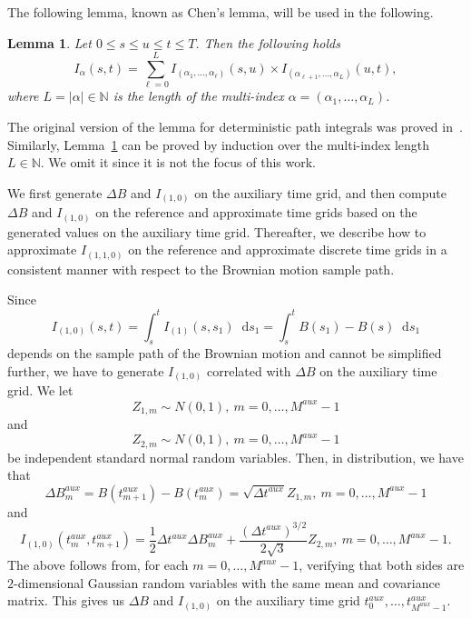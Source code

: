 \documentclass[11pt]{amsart}
\newtheorem{lemma}[theorem]{Lemma}
\newcommand*\diff{\mathop{}\!\mathrm{d}}
\begin{document}
{The following lemma, known as Chen's lemma, will be used in the following.
\begin{lemma}\label{lem:Chen_lemma}
Let $0 \leq s \leq u \leq t \leq T$. Then the following holds
\begin{equation*}
I_{\alpha}(s,t) = \sum_{\ell=0}^{L} I_{(\alpha_{1},\ldots,\alpha_{\ell})}(s,u) \times I_{(\alpha_{\ell+1},\ldots,\alpha_{L})}(u,t),
\end{equation*}
where $L = | \alpha| \in \mathbb{N}$ is the length of the multi-index $\alpha = (\alpha_{1},\ldots,\alpha_{L})$.
\end{lemma}
The original version of the lemma for deterministic path integrals was proved in~\cite{MR73174}. Similarly, Lemma~\ref{lem:Chen_lemma} can be proved by induction over the multi-index length $L \in \mathbb{N}$. We omit it since it is not the focus of this work.  

We first generate $\Delta B$ and $I_{(1,0)}$ on the auxiliary time grid, and then compute $\Delta B$ and $I_{(1,0)}$ on the reference and approximate time grids based on the generated values on the auxiliary time grid. Thereafter, we describe how to approximate $I_{(1,1,0)}$ on the reference and approximate discrete time grids in a consistent manner with respect to the Brownian motion sample path.

Since
\begin{equation*}
I_{(1,0)}(s,t) = \int_{s}^{t} I_{(1)}(s,s_{1}) \diff s_{1} = \int_{s}^{t} B(s_{1})-B(s) \diff s_{1}
\end{equation*}
depends on the sample path of the Brownian motion and cannot be simplified further, we have to generate $I_{(1,0)}$ correlated with $\Delta B$ on the auxiliary time grid. We let
\begin{equation*}
Z_{1,m} \sim N(0,1),\ m=0,\ldots, M^{aux}-1
\end{equation*}
and
\begin{equation*}
Z_{2,m} \sim N(0,1),\ m=0,\ldots,M^{aux}-1 
\end{equation*}
be independent standard normal random variables. Then, in distribution, we have that
\begin{equation*}
\Delta B^{aux}_{m} = B(t_{m+1}^{aux}) - B(t_{m}^{aux}) = \sqrt{\Delta t^{aux}} Z_{1,m},\ m=0,\ldots,M^{aux}-1
\end{equation*}
and
\begin{equation*}
I_{(1,0)}(t_{m}^{aux},t_{m+1}^{aux}) = \frac{1}{2} \Delta t^{aux} \Delta B^{aux}_{m} + \frac{(\Delta t^{aux})^{3/2}}{2 \sqrt{3}} Z_{2,m},\ m=0,\ldots,M^{aux}-1.
\end{equation*}
The above follows from, for each $m=0,\ldots,M^{aux}-1$, verifying that both sides are $2$-dimensional Gaussian random variables with the same mean and covariance matrix. This gives us $\Delta B$ and $I_{(1,0)}$ on the auxiliary time grid $t_{0}^{aux},\ldots,t_{M^{aux}-1}^{aux}$. 

}
\end{document}
